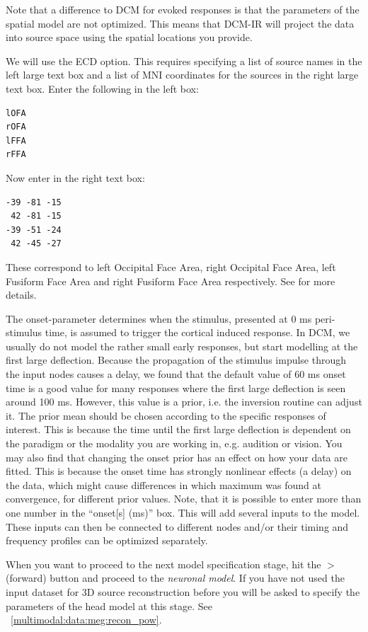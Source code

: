 Note that a difference to DCM for evoked responses is that the parameters of the spatial model are not optimized. This means that DCM-IR will project the data into source space using the spatial locations you provide.

We will use the ECD option. This requires specifying a list of source names in the left large text box and a list of MNI coordinates for the sources in the right large text box. Enter the following in the left box:

\begin{verbatim}
lOFA
rOFA
lFFA
rFFA
\end{verbatim}

Now enter in the right text box:

\begin{verbatim}
-39 -81 -15
 42 -81 -15
-39 -51 -24
 42 -45 -27
\end{verbatim}

These correspond to left Occipital Face Area, right Occipital Face Area, left Fusiform Face Area and right Fusiform Face Area respectively. See \cite{cc_induced} for more details.

The onset-parameter determines when the stimulus, presented at 0 ms peri-stimulus time, is assumed to trigger the cortical induced response. In DCM, we usually do not model the rather small early responses, but start modelling at the first large deflection. Because the propagation of the stimulus impulse through the input nodes causes a delay, we found that the default value of 60
ms onset time is a good value for many responses where the first large deflection is seen around 100 ms. However, this value is a
prior, i.e. the inversion routine can adjust it. The prior mean should be chosen according to the specific responses of interest. This is because the time until the first large deflection is dependent on the paradigm or the modality you are working in, e.g. audition or vision. You may also find that changing the onset prior has an effect on how your data are
fitted. This is because the onset time has strongly nonlinear effects (a delay) on the data, which might cause differences in which maximum was found at convergence, for different prior values. Note, that it is possible to enter more than one number in the ``onset[s] (ms)'' box. This will add several inputs to the model. These inputs can then be connected to different nodes and/or their timing and frequency profiles can be optimized separately.

When you want to proceed to the next model specification stage, hit the $>$ (forward) button and proceed to the \textit{neuronal model}. If you have not used the input dataset for 3D source reconstruction before you will be asked to specify the parameters of the head model at this stage. See ~\ref{multimodal:data:meg:recon_pow}.

